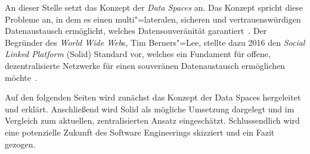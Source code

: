 An dieser Stelle setzt das Konzept der \emph{Data Spaces} an. Das Konzept spricht diese Probleme an, in dem es einen multi"=lateralen, sicheren und vertrauenswürdigen Datenaustausch ermöglicht, welches Datensouveränität garantiert~\cite{mollerIndustrialDataEcosystems2024}.
Der Begründer des \emph{World Wide Web}s, Tim Berners"=Lee, stellte dazu 2016 den \emph{Social Linked Platform} (Solid) Standard vor, welches ein Fundament für offene, dezentralisierte Netzwerke für einen souveränen Datenaustausch ermöglichen möchte~\cite{mecklerWebLinkedData2023}.

Auf den folgenden Seiten wird zunächst das Konzept der Data Spaces hergeleitet und erklärt. Anschließend wird Solid als mögliche Umsetzung dargelegt und im Vergleich zum aktuellen, zentralisierten Ansatz eingeschätzt. Schlussendlich wird eine potenzielle Zukunft des Software Engineerings skizziert und ein Fazit gezogen.
